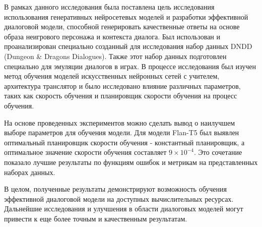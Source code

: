 В рамках данного исследования была поставлена цель исследования использования генеративных нейросетевых моделей и разработки эффективной диалоговой модели, способной генерировать качественные ответы на основе образа неигрового персонажа и контекста диалога. Был использован и проанализирован специально созданный для исследования набор данных DNDD (Dungeon \& Dragons Dialogues). Также этот набор данных подготовлен специально для эмуляции диалогов в играх. В процессе исследования был изучен метод обучения моделей искусственных нейронных сетей с учителем, архитектура транслятор и было исследовано влияние различных параметров, таких как скорость обучения и планировщик скорости обучения на процесс обучения.

На основе проведенных экспериментов можно сделать вывод о наилучшем выборе параметров для обучения модели. Для модели Flan-T5 был выявлен оптимальный планировщик скорости обучения - константный планировщик, а оптимальное значение скорости обучения составляет $9 \times 10^{-4}$. Это сочетание показало лучшие результаты по функциям ошибок и метрикам на представленных наборах данных.

В целом, полученные результаты демонстрируют возможность обучения эффективной диалоговой модели на доступных вычислительных ресурсах. Дальнейшие исследования и улучшения в области диалоговых моделей могут привести к еще более точным и качественным результатам.